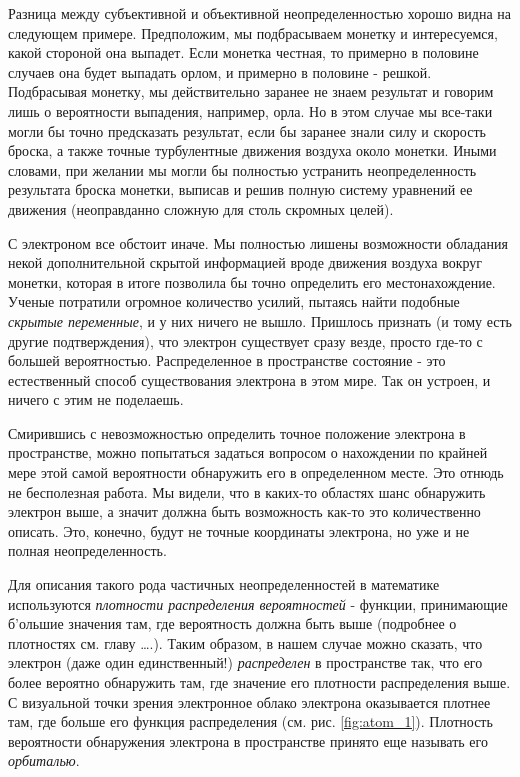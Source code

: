 Разница между субъективной и объективной неопределенностью хорошо видна на следующем примере.
Предположим, мы подбрасываем монетку и интересуемся, какой стороной она выпадет.
Если монетка честная, то примерно в половине случаев она будет выпадать орлом, и примерно в половине - решкой.
Подбрасывая монетку, мы действительно заранее не знаем результат и говорим лишь о вероятности выпадения, например, орла.
Но в этом случае мы все-таки могли бы точно предсказать результат, если бы заранее знали силу и скорость броска, а также точные турбулентные движения воздуха около монетки.
Иными словами, при желании мы могли бы полностью устранить неопределенность результата броска монетки, выписав и решив полную систему уравнений ее движения (неоправданно сложную для столь скромных целей). 

С электроном все обстоит иначе.
Мы полностью лишены возможности обладания некой дополнительной скрытой информацией вроде движения воздуха вокруг монетки, которая в итоге позволила бы точно определить его местонахождение.
Ученые потратили огромное количество усилий, пытаясь найти подобные \textit{скрытые переменные}, и у них ничего не вышло.
Пришлось признать (и тому есть другие подтверждения), что электрон существует сразу везде, просто где-то с большей вероятностью. 
Распределенное в пространстве состояние - это естественный способ существования электрона в этом мире.
Так он устроен, и ничего с этим не поделаешь. 

Смирившись с невозможностью определить точное положение электрона в пространстве, можно попытаться задаться вопросом о нахождении по крайней мере этой самой вероятности обнаружить его в определенном месте.
Это отнюдь не бесполезная работа.
Мы видели, что в каких-то областях шанс обнаружить электрон выше, а значит должна быть возможность как-то это количественно описать.
Это, конечно, будут не точные координаты электрона, но уже и не полная неопределенность.

Для описания такого рода частичных неопределенностей в математике используются \textit{плотности распределения вероятностей} - функции, принимающие б'ольшие значения там, где вероятность должна быть выше (подробнее о плотностях см. главу ….).
Таким образом, в нашем случае можно сказать, что электрон (даже один единственный!) \textit{распределен} в пространстве так, что его более вероятно обнаружить там, где значение его плотности распределения выше.
С визуальной точки зрения электронное облако электрона оказывается плотнее там, где больше его функция распределения (см. рис. \ref{fig:atom_1}).
Плотность вероятности обнаружения электрона в пространстве принято еще называть его \textit{орбиталью}.

